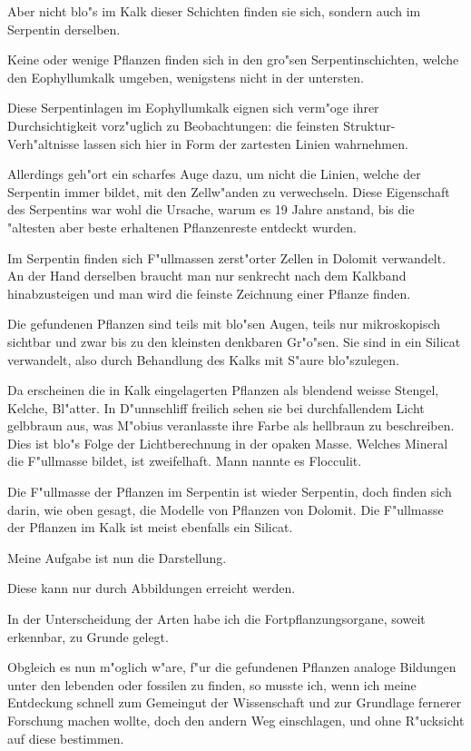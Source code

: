 \documentclass[a4paper, 11pt, oneside, german]{article}
\begin{document}
Aber nicht blo"s im Kalk dieser Schichten finden sie sich, sondern auch im Serpentin derselben.

Keine oder wenige Pflanzen finden sich in den gro"sen Serpentinschichten, welche den Eophyllumkalk umgeben, wenigstens nicht in der untersten.

Diese Serpentinlagen im Eophyllumkalk eignen sich verm"oge ihrer Durchsichtigkeit vorz"uglich zu Beobachtungen: die feinsten Struktur-Verh"altnisse lassen sich hier in Form der zartesten Linien wahrnehmen.

Allerdings geh"ort ein scharfes Auge dazu, um nicht die Linien, welche der Serpentin immer bildet, mit den Zellw"anden zu verwechseln. Diese Eigenschaft des Serpentins war wohl die Ursache, warum es 19 Jahre anstand, bis die "altesten aber beste erhaltenen Pflanzenreste entdeckt wurden.

Im Serpentin finden sich F"ullmassen zerst"orter Zellen in Dolomit verwandelt. An der Hand derselben braucht man nur senkrecht nach dem Kalkband hinabzusteigen und man wird die feinste Zeichnung einer Pflanze finden.

Die gefundenen Pflanzen sind teils mit blo"sen Augen, teils nur mikroskopisch sichtbar und zwar bis zu den kleinsten denkbaren Gr"o"sen. Sie sind in ein Silicat verwandelt, also durch Behandlung des Kalks mit S"aure blo"szulegen.

Da erscheinen die in Kalk eingelagerten Pflanzen als blendend weisse Stengel, Kelche, Bl"atter. In D"unnschliff freilich sehen sie bei durchfallendem Licht gelbbraun aus, was M"obius veranlasste ihre Farbe als hellbraun zu beschreiben. Dies ist blo"s Folge der Lichtberechnung in der opaken Masse. Welches Mineral die F"ullmasse bildet, ist zweifelhaft. Mann nannte es Flocculit.

Die F"ullmasse der Pflanzen im Serpentin ist wieder Serpentin, doch finden sich darin, wie oben gesagt, die Modelle von Pflanzen von Dolomit. Die F"ullmasse der Pflanzen im Kalk ist meist ebenfalls ein Silicat.

Meine Aufgabe ist nun die Darstellung.

Diese kann nur durch Abbildungen erreicht werden.

In der Unterscheidung der Arten habe ich die Fortpflanzungsorgane, soweit erkennbar, zu Grunde gelegt.

Obgleich es nun m"oglich w"are, f"ur die gefundenen Pflanzen analoge Bildungen unter den lebenden oder fossilen zu finden, so musste ich, wenn ich meine Entdeckung schnell zum Gemeingut der Wissenschaft und zur Grundlage fernerer Forschung machen wollte, doch den andern Weg einschlagen, und ohne R"ucksicht auf diese bestimmen.
\end{document}
